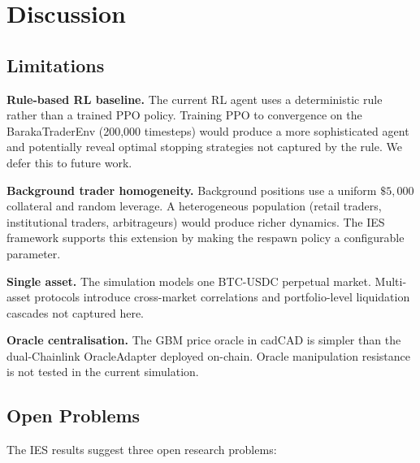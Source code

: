 \documentclass[10pt,twocolumn]{article}
\theoremstyle{plain}
\theoremstyle{definition}
\begin{document}
\section{Discussion}
\label{sec:discussion}

\subsection{Limitations}

\textbf{Rule-based RL baseline.}  The current RL agent uses
a deterministic rule rather than a trained PPO policy.
Training PPO to convergence on the BarakaTraderEnv
(200{,}000 timesteps) would produce a more sophisticated
agent and potentially reveal optimal stopping strategies
not captured by the rule.  We defer this to future work.

\textbf{Background trader homogeneity.}  Background positions
use a uniform $\$5{,}000$ collateral and random leverage.
A heterogeneous population (retail traders, institutional
traders, arbitrageurs) would produce richer dynamics.
The IES framework supports this extension by making
the respawn policy a configurable parameter.

\textbf{Single asset.}  The simulation models one BTC-USDC
perpetual market.  Multi-asset protocols introduce
cross-market correlations and portfolio-level liquidation
cascades not captured here.

\textbf{Oracle centralisation.}  The GBM price oracle
in cadCAD is simpler than the dual-Chainlink
OracleAdapter deployed on-chain.  Oracle manipulation
resistance \cite{Werner2021} is not tested in the current
simulation.

\subsection{Open Problems}

The IES results suggest three open research problems:
\end{document}
